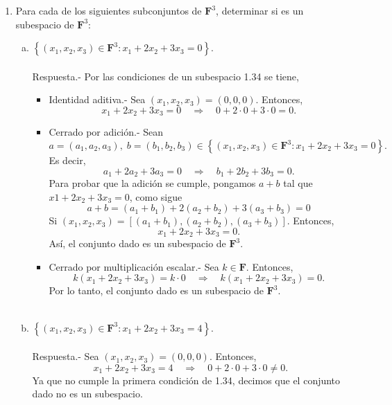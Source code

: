 \begin{enumerate}[\bfseries 1.]

    \item Para cada de los siguientes subconjuntos de $\textbf{F}^3$, determinar si es un subespacio de $\textbf{F}^3:$
	\begin{enumerate}[(a)]

	    \item $\left\{(x_1,x_2,x_3)\in \textbf{F}^3 : x_1+2x_2+3x_3=0\right\}$.\\\\
		Respuesta.-\; Por las condiciones de un subespacio 1.34 se tiene,\\
		\begin{itemize}
		    \item Identidad aditiva.- \; Sea $(x_1,x_2,x_3)=(0,0,0)$. Entonces,
			$$x_1+2x_2+3x_3=0 \quad \Rightarrow \quad 0+2\cdot 0+3\cdot 0 = 0.$$

		    \item Cerrado por adición.-\; Sean 
		    $$a=(a_1,a_2,a_3),\; b=(b_1,b_2,b_3)\in \left\{(x_1,x_2,x_3)\in \textbf{F}^3 : x_1+2x_2+3x_3=0\right\}.$$ 
		    Es decir,
		    $$a_1+2a_2+3a_3=0 \quad \Rightarrow \quad b_1+2b_2+3b_3=0.$$
		    Para probar que la adición se cumple, pongamos $a+b$ tal que $x1+2x_2+3x_3=0$, como sigue
		    $$a+b=(a_1+b_1)+2(a_2+b_2)+3(a_3+b_3)=0$$
		    Si $(x_1,x_2,x_3)= \left[(a_1+b_1),(a_2+b_2),(a_3+b_3)\right]$. Entonces,
		    $$x_1+2x_2+3x_3=0.$$
		    Así, el conjunto dado es un subespacio de $\textbf{F}^3$.\\

		    \item Cerrado por multiplicación escalar.-\; Sea $k\in \textbf{F}$. Entonces,
			$$k\left(x_1+2x_2+3x_3\right)=k\cdot 0\quad \Rightarrow \quad k\left(x_1+2x_2+3x_3\right)=0.$$
			Por lo tanto, el conjunto dado es un subespacio de $\textbf{F}^3$.\\\\
		\end{itemize}

	    \item $\left\{(x_1,x_2,x_3)\in \textbf{F}^3 : x_1+2x_2+3x_3=4\right\}$.\\\\
		Respuesta.-\; Sea $(x_1,x_2,x_3)=(0,0,0)$. Entonces,
		$$x_1+2x_2+3x_3=4\quad \Rightarrow \quad 0+2\cdot 0 + 3\cdot 0 \neq 0.$$
		Ya que no cumple la primera condición de 1.34, decimos que el conjunto dado no es un subespacio.\\\\


\end{enumerate}
\end{enumerate}
